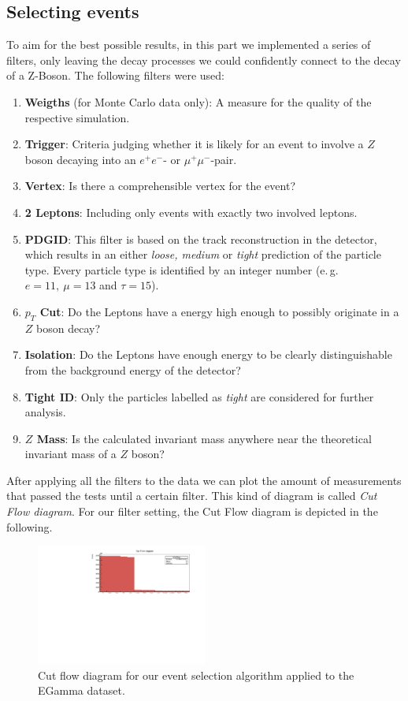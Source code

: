 \documentclass[twocolumn,
			   showpacs,%
               nofootinbib,
               aps,%
               prd,
               notitlepage,
               showkeys,
               10pt]{revtex4-1}
\begin{document}
\subsection{Selecting events}
To aim for the best possible results, in this part we implemented a series of filters, only leaving the decay processes we could confidently connect to the decay of a Z-Boson.
The following filters were used:
\begin{enumerate}
\item \textbf{Weigths} (for Monte Carlo data only): A measure for the quality of the respective simulation.
\item \textbf{Trigger}: Criteria judging whether it is likely for an event to involve a $Z$ boson decaying into an $e^{+}e^{-}$- or $\mu^{+}\mu^{-}$-pair.
\item \textbf{Vertex}: Is there a comprehensible vertex for the event?
\item \textbf{2 Leptons}: Including only events with exactly two involved leptons.
\item \textbf{PDGID}: This filter is based on the track reconstruction in the detector, which results in an either \textit{loose, medium} or \textit{tight} prediction of the particle type. Every particle type is identified by an integer number (e.\,g. $e = 11 , \ \mu = 13$ and $\tau = 15$).
\item \textbf{$p_T$ Cut}: Do the Leptons have a energy high enough to possibly originate in a $Z$ boson decay?
\item \textbf{Isolation}: Do the Leptons have enough energy to be clearly distinguishable from the background energy of the detector? 
\item \textbf{Tight ID}: Only the particles labelled as \textit{tight} are considered for further analysis.
\item \textbf{$Z$ Mass}: Is the calculated invariant mass anywhere near the theoretical invariant mass of a $Z$ boson?
\end{enumerate}

After applying all the filters to the data we can plot the amount of measurements that passed the tests until a certain  filter. This kind of diagram is called \textit{Cut Flow diagram}. For our filter setting, the Cut Flow diagram is depicted in the following.
\begin{figure}[H]
\centering
\includegraphics[width = 0.5\textwidth]
{figures/plots/CutFlowEGamma}
\caption{Cut flow diagram for our event selection algorithm applied to the EGamma dataset.}	
\end{figure}
\end{document}
